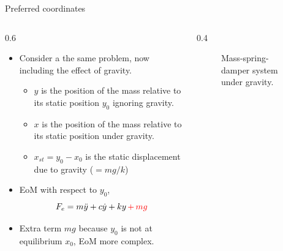 \documentclass[11pt,aspectratio=169,handout]{beamer}
\begin{document}
\begin{frame}[c]{Preferred coordinates}
	\begin{columns}[T]
		\begin{column}{0.6\textwidth}
			\begin{itemize}
				\item<1-> Consider a the same problem, now including the effect of gravity.
				\begin{itemize}
					\item[-] $y$ is the position of the mass relative to its static position $y_0$ ignoring gravity.
					\item[-] $x$ is the position of the mass relative to its static position under gravity.
					\item[-] $x_{st}=y_0-x_0$ is the static displacement due to gravity ($=mg/k$)
				\end{itemize}
				\item EoM with respect to $y_0$,
				\begin{equation}\label{EoM2}
					F_e = m\ddot{y} + c\dot{y} + ky {\,\color{red}+ \, mg}
				\end{equation}
			\item Extra term $mg$ because $y_0$ is not at equilibrium $x_0$, EoM more complex.
			\end{itemize}
		\end{column}
		\begin{column}{0.4\textwidth}
			\begin{figure}
				
				\caption{Mass-spring-damper system under gravity.}
			\end{figure}
		\end{column}
	\end{columns}
\end{frame}
\end{document}

